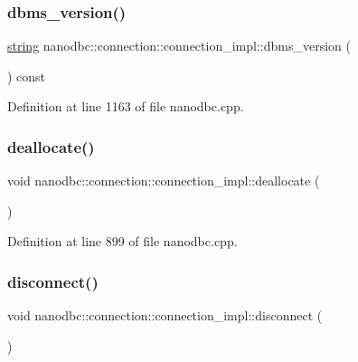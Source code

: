 \subsubsection{\texorpdfstring{dbms\_version()}{dbms\_version()}}
{\footnotesize\ttfamily \mbox{\hyperlink{namespacenanodbc_abfc0ece56278e590911ec8352774c212}{string}} nanodbc\+::connection\+::connection\+\_\+impl\+::dbms\+\_\+version (\begin{DoxyParamCaption}{ }\end{DoxyParamCaption}) const}



Definition at line 1163 of file nanodbc.\+cpp.

\mbox{\label{classnanodbc_1_1connection_1_1connection__impl_a5b1ade50d637ba3c7b99c35cd07a73c5}} 
\subsubsection{\texorpdfstring{deallocate()}{deallocate()}}
{\footnotesize\ttfamily void nanodbc\+::connection\+::connection\+\_\+impl\+::deallocate (\begin{DoxyParamCaption}{ }\end{DoxyParamCaption})\hspace{0.3cm}{\ttfamily [inline]}}



Definition at line 899 of file nanodbc.\+cpp.

\mbox{\label{classnanodbc_1_1connection_1_1connection__impl_a0a79ee37a932f7b8e4ad42d25382f593}} 
\subsubsection{\texorpdfstring{disconnect()}{disconnect()}}
{\footnotesize\ttfamily void nanodbc\+::connection\+::connection\+\_\+impl\+::disconnect (\begin{DoxyParamCaption}{ }\end{DoxyParamCaption})\hspace{0.3cm}{\ttfamily [inline]}}



